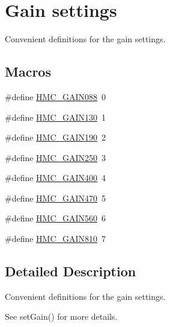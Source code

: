 \hypertarget{group___gain_settings}{\section{Gain settings}
\label{group___gain_settings}
}


Convenient definitions for the gain settings.  


\subsection*{Macros}
\begin{DoxyCompactItemize}
\item 
\#define \hyperlink{group___gain_settings_gaf207890e6273b1f15a84e8b142157da7}{H\+M\+C\+\_\+\+G\+A\+I\+N088}~0
\item 
\#define \hyperlink{group___gain_settings_gadc095c910afd29670ed94d45589a4e94}{H\+M\+C\+\_\+\+G\+A\+I\+N130}~1
\item 
\#define \hyperlink{group___gain_settings_ga35560492e25e3bc4a7d1994afc20bf8d}{H\+M\+C\+\_\+\+G\+A\+I\+N190}~2
\item 
\#define \hyperlink{group___gain_settings_ga1404e79685e5f7a10dea672d388f5efb}{H\+M\+C\+\_\+\+G\+A\+I\+N250}~3
\item 
\#define \hyperlink{group___gain_settings_ga406a5e7c4a8498b42b8ca64bd0435574}{H\+M\+C\+\_\+\+G\+A\+I\+N400}~4
\item 
\#define \hyperlink{group___gain_settings_ga896766dd9b91658ce28119a244de3088}{H\+M\+C\+\_\+\+G\+A\+I\+N470}~5
\item 
\#define \hyperlink{group___gain_settings_ga01cd2748f346ff38dd0ed663662b8ed4}{H\+M\+C\+\_\+\+G\+A\+I\+N560}~6
\item 
\#define \hyperlink{group___gain_settings_ga8c832d026fc407263418262ecfe65650}{H\+M\+C\+\_\+\+G\+A\+I\+N810}~7
\end{DoxyCompactItemize}


\subsection{Detailed Description}
Convenient definitions for the gain settings. 

See {\ttfamily set\+Gain()} for more details. 

